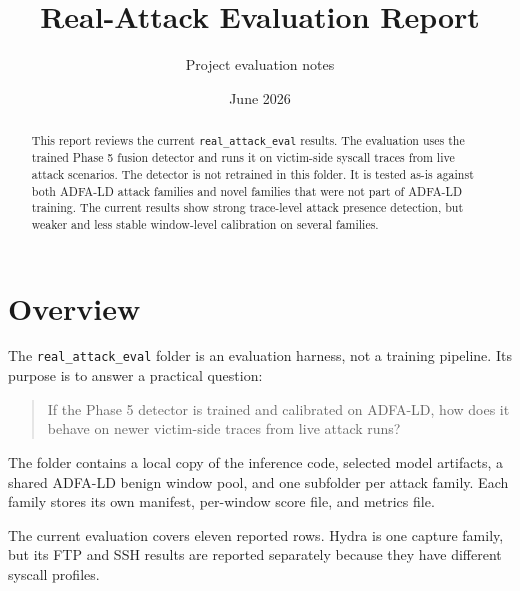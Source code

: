 \documentclass[11pt,a4paper]{article}
\title{Real-Attack Evaluation Report}
\author{Project evaluation notes}
\date{June 2026}
\begin{document}
\maketitle

\begin{abstract}
This report reviews the current \texttt{real\_attack\_eval} results. The evaluation uses the trained Phase 5 fusion detector and runs it on victim-side syscall traces from live attack scenarios. The detector is not retrained in this folder. It is tested as-is against both ADFA-LD attack families and novel families that were not part of ADFA-LD training. The current results show strong trace-level attack presence detection, but weaker and less stable window-level calibration on several families.
\end{abstract}

\section{Overview}

The \texttt{real\_attack\_eval} folder is an evaluation harness, not a training pipeline. Its purpose is to answer a practical question:

\begin{quote}
If the Phase 5 detector is trained and calibrated on ADFA-LD, how does it behave on newer victim-side traces from live attack runs?
\end{quote}

The folder contains a local copy of the inference code, selected model artifacts, a shared ADFA-LD benign window pool, and one subfolder per attack family. Each family stores its own manifest, per-window score file, and metrics file.

The current evaluation covers eleven reported rows. Hydra is one capture family, but its FTP and SSH results are reported separately because they have different syscall profiles.
\end{document}
